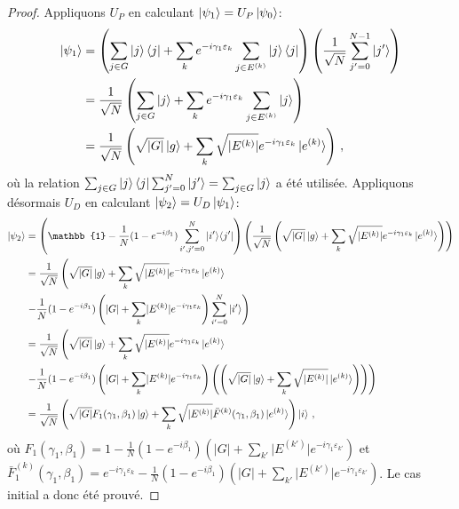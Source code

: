 \begin{proof}
Appliquons $U_{P}$ en calculant $\ket{\psi_{1}} = U_{P} \ket{\psi_{0}}$:
\begin{equation}
\begin{aligned}
    \ket{\psi_{1}} & = \left(\sum_{j \in G} \ket{j}\bra{j} + \sum_{k} e^{-i \gamma_{1} \varepsilon_{k}} \sum_{j \in E^{(k)}} \ket{j}\bra{j} \right) \left( \frac{1}{ \sqrt{ N }} \sum_{j'=0}^{N-1} \ket{j'} \right) \\
    & = \frac{1}{ \sqrt{ N }} \left( \sum_{j \in G} \ket{j} + \sum_{k} e^{-i \gamma_{1} \varepsilon_{k}} \sum_{j \in E^{(k)}} \ket{j} \right) \\
    & = \frac{1}{ \sqrt{ N }} \left( \sqrt{ \lvert G \rvert  } \ket{g} + \sum_{k} \sqrt{ \lvert E^{(k)} \rvert  } e^{-i \gamma_{1} \varepsilon_{k}} \ket{e^{(k)}} \right) \,,
\end{aligned}
\end{equation}
où la relation $\sum_{j \in G}\ket{j}\bra{j} \sum_{j'=0}^{N} \ket{j'} = \sum_{j \in G} \ket{j}$ a été utilisée. Appliquons désormais $U_{D}$ en calculant $\ket{\psi_{2}} = U_{D}\ket{\psi_{1}}$:
\begin{equation}
\begin{aligned}
    \ket{\psi_{2}} &= \left( \mathbb{1} - \frac{1}{N} (1 - e^{-i\beta_{1}}) \sum_{i',j'=0}^{N} \ket{i'}\!\bra{j'} \right) \left( \frac{1}{ \sqrt{ N }} \left( \sqrt{ \lvert G \rvert  } \ket{g} + \sum_{k} \sqrt{ \lvert E^{(k)} \rvert  } e^{-i \gamma_{1} \varepsilon_{k}}  \ket{e^{(k)}} \right) \right) \\
    &=  \frac{1}{ \sqrt{ N }} \left( \sqrt{ \lvert G \rvert  } \ket{g} + \sum_{k} \sqrt{ \lvert E^{(k)} \rvert  } e^{-i \gamma_{1} \varepsilon_{k}}  \ket{e^{(k)}} \right. \\
    & \left. - \frac{1}{N} (1 - e^{-i\beta_{1}}) \left( \lvert G \rvert + \sum_{k} \lvert E^{(k)} \rvert e^{-i \gamma_{1} \varepsilon_{k}} \right) \sum_{i'=0}^{N} \ket{i'} \right) \\
    &=  \frac{1}{ \sqrt{ N }} \left( \sqrt{ \lvert G \rvert  } \ket{g} + \sum_{k} \sqrt{ \lvert E^{(k)} \rvert  } e^{-i \gamma_{1} \varepsilon_{k}}  \ket{e^{(k)}} \right. \\
    & \left. - \frac{1}{N} (1 - e^{-i\beta_{1}}) \left( \lvert G \rvert + \sum_{k} \lvert E^{(k)} \rvert e^{-i \gamma_{1} \varepsilon_{k}}   \right) \left( \left( \sqrt{ \lvert G \rvert  } \ket{g} + \sum_{k} \sqrt{ \lvert E^{(k)} \rvert } \ket{e^{(k)}} \right) \right) \right) \\
    &= \frac{1}{\sqrt{ N }} \left( \sqrt{ \lvert G \rvert } F_{1}(\gamma_{1}, \beta_{1}) \ket{g} + \sum_{k} \sqrt{ \lvert E^{(k)} \rvert } \bar{F}^{(k)}(\gamma_{1}, \beta_{1}) \ket{e^{(k)}} \right) \ket{i} \,,
\end{aligned}
\end{equation}
où $F_{1}(\gamma_{1}, \beta_{1}) = 1 - \frac{1}{N} (1 - e^{-i\beta_{1}}) \left(  \lvert G \rvert + \sum_{k'} \lvert E^{(k')} \rvert e^{-i \gamma_{1} \varepsilon_{k'}} \right)$ et $\bar{F}^{(k)}_{1}(\gamma_{1}, \beta_{1}) = e^{-i\gamma_{1} \varepsilon_{k}} - \frac{1}{N} (1 - e^{-i\beta_{1}}) \left(  \lvert G \rvert + \sum_{k'} \lvert E^{(k')} \rvert e^{-i \gamma_{1} \varepsilon_{k'}} \right)$. Le cas initial a donc été prouvé.


\end{proof}
